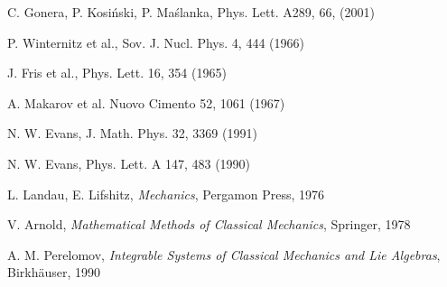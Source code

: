 \documentclass[a4paper,12pt]{article}
\begin{document}
\begin{thebibliography}{9}

C. Gonera, P. Kosi\'nski, P. Ma\'slanka, Phys. Lett. A289, 66, (2001)

P. Winternitz et al., Sov. J. Nucl. Phys. 4, 444 (1966)

J. Fris et al., Phys. Lett. 16, 354 (1965)

A. Makarov et al. Nuovo Cimento 52, 1061 (1967)

N. W. Evans, J. Math. Phys. 32, 3369 (1991)

N. W. Evans, Phys. Lett. A 147, 483 (1990)

L. Landau, E. Lifshitz, {\em Mechanics}\/, Pergamon Press, 1976 

V. Arnold, {\em Mathematical Methods of Classical Mechanics}, Springer, 1978

A. M. Perelomov, {\em Integrable Systems of Classical Mechanics and Lie Algebras}\/, Birkh\"auser, 1990

\end{thebibliography}
\end{document}
